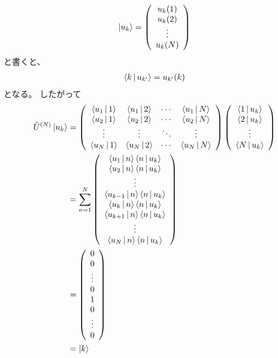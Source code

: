 \documentclass[a4paper, 10pt]{jsarticle}
\begin{document}
\begin{problem}
	\begin{align}
		\Ket{u_k}
		= \left( \begin{array}{c}
			u_k (1) \\
			u_k (2) \\
			\vdots \\
			u_k (N)
		\end{array} \right)
	\end{align}
	と書くと、
	\begin{align}
		\Braket{k | u_{k'}} = u_{k'} (k)
	\end{align}
	となる。
	したがって
	\begin{align}
		\hat{U}^{(N)} \Ket{u_k}
		&= \left( \begin{array}{cccc}
			\Braket{u_1 | 1} & \Braket{u_1 | 2} & \cdots & \Braket{u_1 | N} \\
			\Braket{u_2 | 1} & \Braket{u_2 | 2} & \cdots & \Braket{u_2 | N} \\
			\vdots & \vdots & \ddots & \vdots \\
			\Braket{u_N | 1} & \Braket{u_N | 2} & \cdots & \Braket{u_N | N}
		\end{array} \right) \left( \begin{array}{c}
			\Braket{1 | u_k} \\
			\Braket{2 | u_k} \\
			\vdots \\
			\Braket{N | u_k}
		\end{array} \right) \\
		&= \sum_{n=1}^{N} \left( \begin{array}{c}
			\Braket{u_1 | n} \Braket{n | u_k} \\
			\Braket{u_2 | n} \Braket{n | u_k} \\
			\vdots \\
			\Braket{u_{k-1} | n} \Braket{n | u_k} \\
			\Braket{u_k | n} \Braket{n | u_k} \\
			\Braket{u_{k+1} | n} \Braket{n | u_k} \\
			\vdots \\
			\Braket{u_N | n} \Braket{n | u_k}
		\end{array} \right) \\
		&= \left( \begin{array}{c}
			0 \\
			0 \\
			\vdots \\
			0 \\
			1 \\
			0 \\
			\vdots \\
			0
		\end{array} \right) \\
		&= \Ket{k}
	\end{align}
\end{problem}
\end{document}
